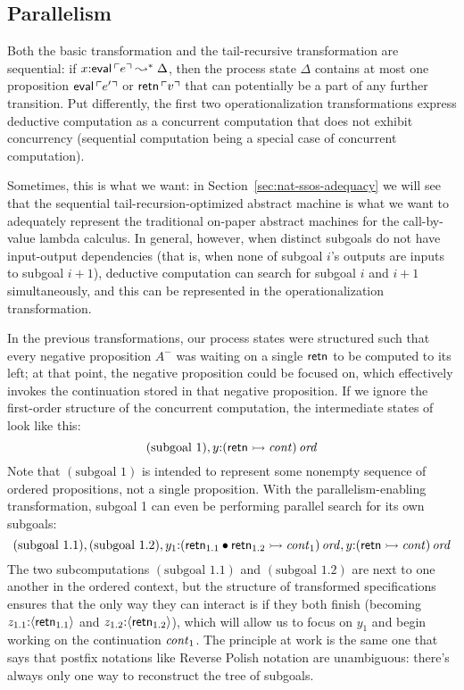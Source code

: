 \subsection{Parallelism}
\label{sec:trans-par}

Both the basic transformation and the tail-recursive transformation
are sequential: if $x{:}{\sf eval}\,{\ulcorner{e}\urcorner} \leadsto^* \Delta$,
then the process state $\Delta$ contains at most one proposition ${\sf
  eval}\,{\ulcorner{e'}\urcorner}$ or ${\sf retn}\,{\ulcorner{v}\urcorner}$ that can potentially
be a part of any further transition. Put differently, the first two
operationalization transformations express deductive computation as a
concurrent computation that does not exhibit concurrency (sequential
computation being a special case of concurrent computation).

Sometimes, this is what we want: in
Section~\ref{sec:nat-ssos-adequacy} we will see that the sequential
tail-recursion-optimized abstract machine is what we want to
adequately represent the traditional on-paper abstract machines for
the call-by-value lambda calculus. In general, however, when distinct
subgoals do not have input-output dependencies (that is, when none of
subgoal $i$'s outputs are inputs to subgoal $i+1$), deductive computation
can search for subgoal $i$ and $i+1$ simultaneously, and this can 
be represented in the operationalization transformation.

In the previous transformations, our process states were structured
such that every negative proposition $A^-$ was waiting on a single
${\sf retn}$ to be computed to its left; at that point, the negative
proposition could be focused on, which effectively invokes the
continuation stored in that negative proposition. If we ignore the
first-order structure of the concurrent computation, the intermediate
states of look like this:
\[
  (\mbox{subgoal 1}), y{:}{({\sf retn} \rightarrowtail {\it cont})}\,{{\it ord}}
\]
Note that $(\mbox{subgoal 1})$ is intended to represent some nonempty
sequence of ordered propositions, not a single proposition. With the
parallelism-enabling transformation, subgoal 1 can even be performing
parallel search for its own subgoals:
\[
 (\mbox{subgoal 1.1}), (\mbox{subgoal 1.2}), 
   y_1{:}{({\sf retn}_{1.1} \mathbin{\bullet} {\sf retn}_{1.2} \rightarrowtail {\it cont}_1)}\,{{\it ord}}, 
   y{:}{({\sf retn} \rightarrowtail {\it cont})}\,{{\it ord}}
\]
The two subcomputations $(\mbox{subgoal 1.1})$ and $(\mbox{subgoal
  1.2})$ are next to one another in the ordered context, but the
structure of transformed specifications ensures that the only way they
can interact is if they both finish (becoming $z_{1.1}{:}\langle {{\sf
    retn}_{1.1}} \rangle$ and $z_{1.2}{:}\langle {{\sf retn}_{1.2}} \rangle$), which will
allow us to focus on $y_1$ and begin working on the continuation ${\it
  cont}_1$. The principle at work is the same one that says that postfix
notations like Reverse Polish notation are unambiguous: there's always
only one way to reconstruct the tree of subgoals. 

